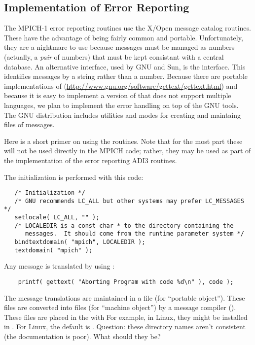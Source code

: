 \documentclass{article}
\begin{document}


\subsection{Implementation of Error Reporting}
\label{sec:error-report-impl}
The MPICH-1 error reporting routines use the X/Open  message
catalog routines.  These have the advantage of being fairly common and
portable.  Unfortunately, they are a nightmare to use because messages must be
managed as numbers (actually, a \emph{pair} of numbers) that must be kept
consistant with a central database.  An 
alternative interface, used by GNU and Sun, is the  interface.
This identifies messages by a string rather than a number.
Because there are portable implementations of 
(\url{http://www.gnu.org/software/gettext/gettext.html}) and because it is
easy to implement a version of  that does not support multiple
languages, we plan to implement the error handling on top of the GNU
 tools.  The GNU  distribution includes utilities
and  modes for creating and maintaing files of messages.

Here is a short primer on using the  routines.  Note that for
the most part these will not be used directly in the MPICH code; rather, they
may be used as part of the implementation of the error reporting ADI3
routines.

The initialization is performed with this code:
\begin{verbatim}
   /* Initialization */
   /* GNU recommends LC_ALL but other systems may prefer LC_MESSAGES */
   setlocale( LC_ALL, "" );
   /* LOCALEDIR is a const char * to the directory containing the
      messages.  It should come from the runtime parameter system */
   bindtextdomain( "mpich", LOCALEDIR );
   textdomain( "mpich" );
\end{verbatim}

Any message is translated by using :
\begin{verbatim}
    printf( gettext( "Aborting Program with code %d\n" ), code );
\end{verbatim}
The message translations are maintained in a  file (for ``portable
object'').  These files are converted into  files (for ``machine
object'') by a message compiler ().  These files are placed in
the  with 
For example, in Linux, they might be installed in
.   For Linux, the default
 is .  
Question: these directory names aren't consistent (the documentation is
poor).  What should they be?
\end{document}
